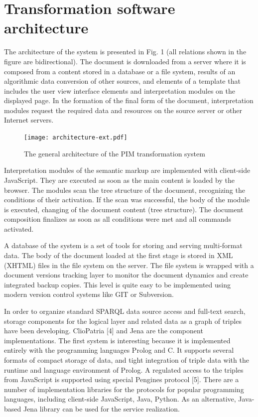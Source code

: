 \documentclass[conference,a4paper]{IEEEtran}
\begin{document}
\section{Transformation software architecture}
\label{sec:arch}

The architecture of the system is presented in Fig. 1 (all relations shown in the figure are bidirectional). The document is downloaded from a server where it is composed from a content stored in a database or a file system, results of an algorithmic data conversion of other sources, and elements of a template that includes the user view interface elements and interpretation modules on the displayed page. In the formation of the final form of the document, interpretation modules request the required data and resources on the source server or other Internet servers.

\begin{figure}[t]
  \centering
  \texttt{[image: architecture-ext.pdf]}
  \caption{The general architecture of the PIM transformation system}
  \label{fig:arch}
\end{figure}


Interpretation modules of the semantic markup are implemented with client-side JavaScript. They are executed as soon as the main content is loaded by the browser. The modules scan the tree structure of the document, recognizing the conditions of their activation. If the scan was successful, the body of the module is executed, changing of the document content (tree structure). The document composition finalizes as soon as all conditions were met and all commands activated.

A database of the system is a set of tools for storing and serving multi-format data. The body of the document loaded at the first stage is stored in XML (XHTML) files in the file system on the server. The file system is wrapped with a document versions tracking layer to monitor the document dynamics and create integrated backup copies. This level is quite easy to be implemented using modern version control systems like GIT or Subversion.

In order to organize standard SPARQL data source access and full-text search, storage components for the logical layer and related data as a graph of triples have been developing. ClioPatria [4] and Jena are the component implementations. The first system is interesting because it is implemented entirely with the programming languages Prolog and C. It supports several formats of compact storage of data, and tight integration of triple data with the runtime and language environment of Prolog. A regulated access to the triples from JavaScript is supported using special Pengines protocol [5]. There are a number of implementation libraries for the protocols for popular programming languages, including client-side JavaScript, Java, Python. As an alternative, Java-based Jena library can be used for the service realization.
\end{document}
